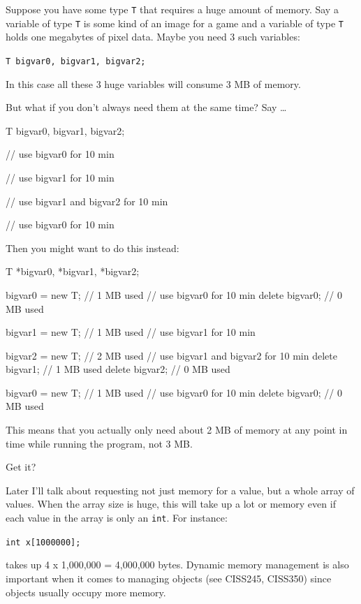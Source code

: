 Suppose you have some type \texttt{T} that requires a huge amount of memory. Say a variable of type \texttt{T} is some kind of an image for a game and a variable of type \texttt{T} holds one megabytes of pixel data. Maybe you need 3 such variables:

\begin{center}
\texttt{T bigvar0, bigvar1, bigvar2;}
\end{center}

In this case all these 3 huge variables will consume 3 MB of memory.

But what if you don't always need them at the same time? Say \ldots

\begin{consolethree}[escapeinside=||]
T bigvar0, bigvar1, bigvar2;

// use bigvar0 for 10 min

// use bigvar1 for 10 min

// use bigvar1 and bigvar2 for 10 min

// use bigvar0 for 10 min 
\end{consolethree}
Then you might want to do this instead:

\begin{consolethree}[escapeinside=||]
T *bigvar0, *bigvar1, *bigvar2;

bigvar0 = new T; // 1 MB used
// use bigvar0 for 10 min
delete bigvar0; // 0 MB used

bigvar1 = new T; // 1 MB used
// use bigvar1 for 10 min

bigvar2 = new T; // 2 MB used
// use bigvar1 and bigvar2 for 10 min
delete bigvar1; // 1 MB used
delete bigvar2; // 0 MB used

bigvar0 = new T; // 1 MB used
// use bigvar0 for 10 min
delete bigvar0; // 0 MB used
\end{consolethree}
This means that you actually only need about 2 MB of memory at any point
in time while running the program, not 3 MB.

Get it?

Later I'll talk about requesting not just memory for a value, but a whole array of values. When the array size is huge, this will take up a lot or memory even if each value in the array is only an \texttt{int}. For instance:

\texttt{int x[1000000];}

takes up 4 x 1,000,000 = 4,000,000 bytes. Dynamic memory management is also important when it comes to managing objects (see CISS245, CISS350) since objects usually occupy more memory.

